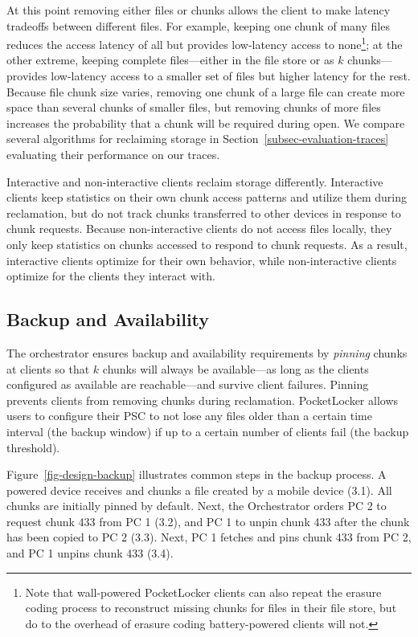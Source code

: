 At this point removing either files or chunks allows the client to make
latency tradeoffs between different files. For example, keeping one chunk of
many files reduces the access latency of all but provides low-latency access
to none\footnote{Note that wall-powered PocketLocker clients can also repeat
the erasure coding process to reconstruct missing chunks for files in their
file store, but do to the overhead of erasure coding battery-powered clients
will not.}; at the other extreme, keeping complete files---either in the file
store or as $k$ chunks---provides low-latency access to a smaller set of
files but higher latency for the rest. Because file chunk size varies,
removing one chunk of a large file can create more space than several chunks
of smaller files, but removing chunks of more files increases the probability
that a chunk will be required during open. We compare several algorithms for
reclaiming storage in Section~\ref{subsec-evaluation-traces} evaluating their
performance on our traces.

Interactive and non-interactive clients reclaim storage differently.
Interactive clients keep statistics on their own chunk access patterns and
utilize them during reclamation, but do not track chunks transferred to other
devices in response to chunk requests. Because non-interactive clients do not
access files locally, they only keep statistics on chunks accessed to respond
to chunk requests. As a result, interactive clients optimize for their own
behavior, while non-interactive clients optimize for the clients they
interact with.

\subsection{Backup and Availability}
\label{subsec-backup}

The orchestrator ensures backup and availability requirements by
\textit{pinning} chunks at clients so that $k$ chunks will always be
available---as long as the clients configured as available are reachable---and
survive client failures. Pinning prevents clients from removing chunks during
reclamation. PocketLocker allows users to configure their PSC to not lose any
files older than a certain time interval (the backup window) if up to a
certain number of clients fail (the backup threshold).

Figure~\ref{fig-design-backup} illustrates common steps in the backup
process.  A powered device receives and chunks a file created by a
mobile device (3.1).  All chunks are initially pinned by default.  Next, the
Orchestrator orders PC 2 to request chunk 433 from PC 1 (3.2), and PC 1 to
unpin chunk 433 after the chunk has been copied to PC 2 (3.3).  Next, PC 1
fetches and pins chunk 433 from PC 2, and PC 1 unpins chunk 433 (3.4). 

